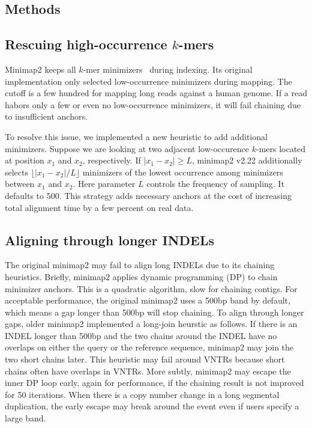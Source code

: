 \documentclass{bioinfo}
\begin{document}
\begin{methods}
\section{Methods}

\subsection{Rescuing high-occurrence $k$-mers}\label{sec:high-occ}
Minimap2 keeps all $k$-mer minimizers~\citep{Roberts:2004fv} during indexing. Its original
implementation only selected low-occurrence minimizers during mapping. The
cutoff is a few hundred for mapping long reads against a human genome. If a
read habors only a few or even no low-occurrence minimizers, it will fail
chaining due to insufficient anchors.

To resolve this issue, we implemented a new heuristic to add additional
minimizers. Suppose we are looking at two adjacent low-occurence $k$-mers
located at position $x_1$ and $x_2$, respectively. If $|x_1-x_2|\ge L$,
minimap2 v2.22 additionally selects $\lfloor|x_1-x_2|/L\rfloor$ minimizers
of the lowest occurrence among minimizers between $x_1$ and $x_2$. Here
parameter $L$ controls the frequency of sampling. It defaults to 500.
This strategy adds necessary anchors at the cost of increasing total alignment
time by a few percent on real data.

\subsection{Aligning through longer INDELs}
The original minimap2 may fail to align long INDELs due to its chaining
heuristics. Briefly, minimap2 applies dynamic programming (DP) to chain
minimizer anchors. This is a quadratic algorithm, slow for chaining
contigs. For acceptable performance, the original minimap2 uses a 500bp band by
default, which means a gap longer than 500bp will stop chaining.
To align through longer gaps, older minimap2 implemented a long-join heurstic as follows.
If there is an INDEL longer than 500bp and the two chains around the INDEL
have no overlaps on either the query or the reference sequence, minimap2 may
join the two short chains later.
This heuristic may fail around VNTRs because short chains
often have overlaps in VNTRs. More subtly, minimap2 may escape the inner DP
loop early, again for performance, if the chaining result is not improved for
50 iterations. When there is a copy number change in a long segmental
duplication, the early escape may break around the event even if users
specify a large band.


\end{methods}
\end{document}
